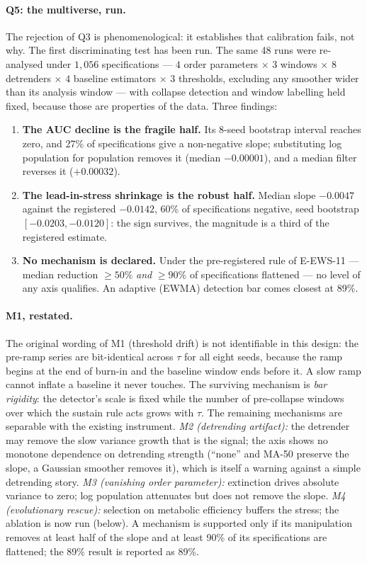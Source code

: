\documentclass[11pt,a4paper]{article}
\begin{document}
\paragraph{Q5: the multiverse, run.} The rejection of Q3 is phenomenological: it
establishes that calibration fails, not why. The first discriminating test has
been run. The same 48 runs were re-analysed under $1{,}056$ specifications ---
$4$ order parameters $\times$ $3$ windows $\times$ $8$ detrenders $\times$ $4$
baseline estimators $\times$ $3$ thresholds, excluding any smoother wider than
its analysis window --- with collapse detection and window labelling held fixed,
because those are properties of the data. Three findings:

\begin{enumerate}\setlength\itemsep{1pt}
\item \textbf{The AUC decline is the fragile half.} Its 8-seed bootstrap
interval reaches zero, and 27\% of specifications give a non-negative slope;
substituting log population for population removes it (median $-0.00001$), and a
median filter reverses it ($+0.00032$).
\item \textbf{The lead-in-stress shrinkage is the robust half.} Median slope
$-0.0047$ against the registered $-0.0142$, 60\% of specifications negative,
seed bootstrap $[-0.0203, -0.0120]$: the sign survives, the magnitude is a third
of the registered estimate.
\item \textbf{No mechanism is declared.} Under the pre-registered rule of
E-EWS-11 --- median reduction $\ge 50\%$ \emph{and} $\ge 90\%$ of specifications
flattened --- no level of any axis qualifies. An adaptive (EWMA) detection bar
comes closest at 89\%.
\end{enumerate}

\paragraph{M1, restated.} The original wording of M1 (threshold drift) is not
identifiable in this design: the pre-ramp series are bit-identical across $\tau$
for all eight seeds, because the ramp begins at the end of burn-in and the
baseline window ends before it. A slow ramp cannot inflate a baseline it never
touches. The surviving mechanism is \emph{bar rigidity}: the detector's scale is
fixed while the number of pre-collapse windows over which the sustain rule acts
grows with $\tau$. The remaining mechanisms are separable with the existing
instrument. \emph{M2 (detrending artifact):} the detrender may remove the slow
variance growth that is the signal; the axis shows no monotone dependence on
detrending strength (``none'' and MA-50 preserve the slope, a Gaussian
smoother removes it), which is itself a warning against a simple detrending
story. \emph{M3 (vanishing order parameter):} extinction drives absolute
variance to zero; log population attenuates but does not remove the slope.
\emph{M4 (evolutionary rescue):} selection on metabolic efficiency buffers the
stress; the ablation is now run (below). A mechanism is supported only if its
manipulation removes at least half of the slope and at least 90\% of its
specifications are flattened; the 89\% result is reported as 89\%.
\end{document}

